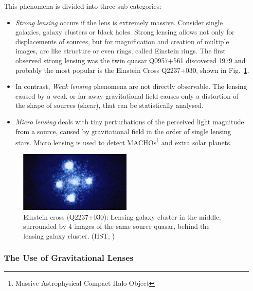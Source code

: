 \documentclass[11pt]{article}
\begin{document}
This phenomena is divided into three sub categories:
\begin{itemize}
  \item
    \emph{Strong lensing} occurs if the lens is extremely massive. Consider single galaxies, galaxy clusters or black holes.
    Strong lensing allows not only for displacements of sources, but for magnification and creation of multiple images, arc like structure or even rings, called Einstein rings.
    The first observed strong lensing was the twin quasar Q0957+561 discovered 1979\cite{walsh19790957} and probably the most popular is the Einstein Cross Q2237+030\cite{ec1985}, shown in Fig.~\ref{fig:einsteinc}.
  \item
    In contrast, \emph{Weak lensing} phenomena are not directly observable.
    The lensing caused by a weak or far away gravitational field causes only a distortion of the shape of sources (shear), that can be statistically analysed.
  \item
    \emph{Micro lensing} deals with tiny perturbations of the perceived light magnitude from a source, caused by gravitational field in the order of single lensing stars.
    Micro lensing is used to detect MACHOs\footnote{Massive Astrophysical Compact Halo Object} and extra solar planets.
\end{itemize}

\begin{figure}[h]
	\centering
		\includegraphics[width=0.5\textwidth]{img/einstein_cross}
	\caption{Einstein cross (Q2237+030): Lensing galaxy cluster in the middle, surrounded by 4 images of the same source quasar, behind the lensing galaxy cluster. (HST; \cite{ec1985})}
	\label{fig:einsteinc}
\end{figure}



\subsubsection{The Use of Gravitational Lenses}
\end{document}
